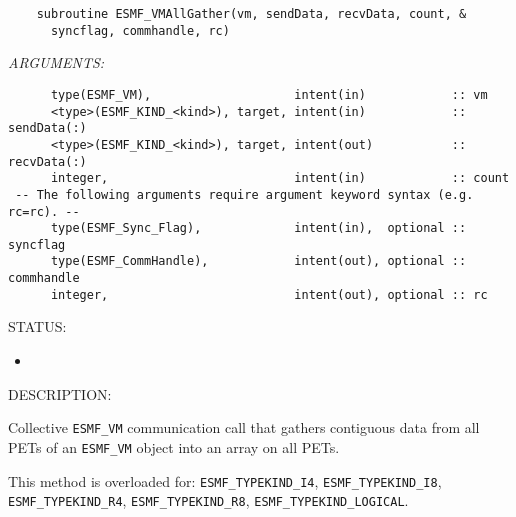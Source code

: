   
\begin{verbatim}    subroutine ESMF_VMAllGather(vm, sendData, recvData, count, &
      syncflag, commhandle, rc)\end{verbatim}{\em ARGUMENTS:}
\begin{verbatim}      type(ESMF_VM),                    intent(in)            :: vm
      <type>(ESMF_KIND_<kind>), target, intent(in)            :: sendData(:)
      <type>(ESMF_KIND_<kind>), target, intent(out)           :: recvData(:)
      integer,                          intent(in)            :: count
 -- The following arguments require argument keyword syntax (e.g. rc=rc). --
      type(ESMF_Sync_Flag),             intent(in),  optional :: syncflag
      type(ESMF_CommHandle),            intent(out), optional :: commhandle
      integer,                          intent(out), optional :: rc\end{verbatim}
{\sf STATUS:}
   \begin{itemize}
   \item{}
   \end{itemize}
  
{\sf DESCRIPTION:\\ }


     Collective {\tt ESMF\_VM} communication call that gathers contiguous data 
     from all PETs of an {\tt ESMF\_VM} object into an array on all PETs.
  
     This method is overloaded for:
     {\tt ESMF\_TYPEKIND\_I4}, {\tt ESMF\_TYPEKIND\_I8},
     {\tt ESMF\_TYPEKIND\_R4}, {\tt ESMF\_TYPEKIND\_R8}, 
     {\tt ESMF\_TYPEKIND\_LOGICAL}.
  
